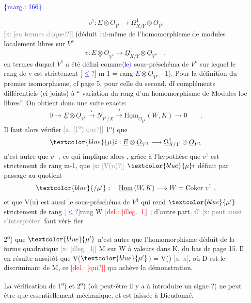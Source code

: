 \documentclass[11pt]{article}
\newcommand{\scanpage}[1]{\par\bigskip\noindent{\small\sffamily[scan #1]}\par}
\newcommand{\mspage}[1]{{\small\sffamily[p.\,#1]}}
\newcommand{\hand}[1]{\textcolor{blue}{#1}}
\let\over\relax
\newcommand{\over}[2]{\textcolor{gray}{#1}\textcolor{blue}{\ensuremath{^{\!\nearrow}}#2}}
\newcommand{\inserted}[2][]{\textcolor{blue}{$\langle$#2$\rangle$}}
\newcommand{\margin}[1]{\textcolor{blue}{\{\textsf{marg.:} #1\}}}
\newcommand{\deleted}[1]{\textcolor{red}{[\textsf{del.:} #1]}}
\newcommand{\xout}[1]{\textcolor{gray}{[\textsf{x:} #1]}}
\newcommand{\unsure}[1]{[#1?]}
\newcommand{\illegible}[1]{[\textsf{illeg.\ #1}]}
\begin{document}
\margin{166}

\clearpage
\scanpage{25/167}
\mspage{\hand{2}}

\[ v^1 : E\otimes\underline{O}_{V^1} \longrightarrow \underline{\Omega}^1_{X/Y}\otimes\underline{O}_{V^1} \]
\xout{\unsure{en termes duquel}} (déduit  lui-même de l'homomorphisme de modules
localement libres sur $V^o$
\[ v : \underline{E\otimes O}_{V^o} \longrightarrow \underline{\Omega}^1_{X/Y}\otimes \underline{O}_{V^o} \quad , \]
en termes duquel  $V^1$ a été défini comme\inserted{le} sous-préschéma de $V^o$ sur lequel
le rang de v est strictement \hand{\unsure{$\leq$}} m-1 = rang $E\otimes\underline{O}_{V^o}$ - 1). Pour la définition
du premier isomorphisme, cf page 5, pour celle du second, df compléments
différentiels (ci joints) à `` variation du rang d'un homomorphisme de
Modules loc libres''. On obtient donc une suite exacte:
\[ 0 \to \underline{E}\otimes\underline{O}_{V^1} \xrightarrow{\ i\ } \underline{N}_{V^1/X} \xrightarrow{\ \ j\ \ } \underline{\mathrm{Hom}}_{\underline{O}_{V^1}}(W,K) \longrightarrow 0 \qquad . \]
Il faut alors vérifier \xout{\unsure{1\textsuperscript{o}) que}}
1\textsuperscript{o}) que
\[ \hand{\mu}i : \underline{E}\otimes\underline{O}_{V^1} \longrightarrow \underline{\Omega}^1_{X/Y}\otimes\underline{O}_{V^1} \]
n'est autre que $v^1$ , ce qui implique alors , grâce à l'hypothèse que
$v^1$ est strictement de rang m-1, que \xout{\unsure{V(u)}} $\hand{\mu}i$ définit par passage au
quotient
\[ \hand{/\mu'} : \quad \underline{\mathrm{Hom}}\,(W,K) \longrightarrow W = \mathrm{Coker}\ v^1 \ , \]
et que V(u) est aussi le sous-préschéma de $V^1$ qui rend $\hand{\mu'}$ strictement
de rang \hand{\unsure{$\leq$}}rang W \deleted{\illegible{1}} ; d'autre part, il' \xout{peut aussi s'interpréter} faut véri-%
fier

2\textsuperscript{o}) que $\hand{\mu'}$ n'est autre que l'homomorphisme déduit de la forme
quadratique \xout{\illegible{1}} M sur W à valeurs dans K, du bas de page 15. Il en résulte
aussitôt que V($\hand{\mu'}$) = V(\over{\illegible{1}}{D}) \xout{x}, où D est le discriminant de M, ce \deleted{\unsure{qui}} qui
achève la démonstration.

La vérification de 1\textsuperscript{o}) et 2\textsuperscript{o}) (où peut-être il y a à introduire un
signe ?) ne peut être que essentiellement méchanique, et est laissée à
Dieudonné.
\end{document}
